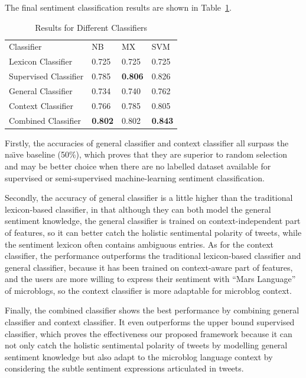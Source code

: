 \documentclass{llncs}
\begin{document}
The final sentiment classification results are shown in Table~\ref{t1}. 
\begin{table}
\caption{Results for Different Classifiers}
\label{t1}
\centering
\begin{tabular}{llll}
\hline\noalign{\bigskip}
Classifier &   NB    &    MX    &    SVM    \\
\noalign{\bigskip}
\hline
\noalign{\bigskip}
Lexicon Classifier & 0.725 & 0.725 & 0.725 \\
Supervised Classifier & 0.785 & \textbf{0.806} & 0.826 \\
General Classifier & 0.734 &  0.740 & 0.762 \\
Context Classifier & 0.766 & 0.785 & 0.805 \\
Combined Classifier & \textbf{0.802} & 0.802 & \textbf{0.843} \\
\hline
\end{tabular}
\end{table}

Firstly, the accuracies of general classifier and context classifier all surpass the na\"\i ve baseline (50\%), which proves that they are superior to random selection and may be better choice when there are no labelled dataset available for supervised or semi-supervised machine-learning sentiment classification.

Secondly, the accuracy of general classifier is a little higher than the traditional lexicon-based classifier, in that although they can both model the general sentiment knowledge, the general classifier is trained on context-independent part of features, so it can better catch the holistic sentimental polarity of tweets, while the sentiment lexicon often contains ambiguous entries. 
As for the context classifier, the performance outperforms the traditional lexicon-based classifier and general classifier, because it has been trained on context-aware part of features, and the users are more willing to express their sentiment with ``Mars Language'' of microblogs, so the context classifier is more adaptable for microblog context.

Finally, the combined classifier shows the best performance by combining general classifier and context classifier. 
It even outperforms the upper bound supervised classifier, which proves the effectiveness our proposed framework because it can not only catch the holistic sentimental polarity of tweets by modelling general sentiment knowledge but also adapt to the microblog language context by considering the subtle sentiment expressions articulated in tweets.
\end{document}

